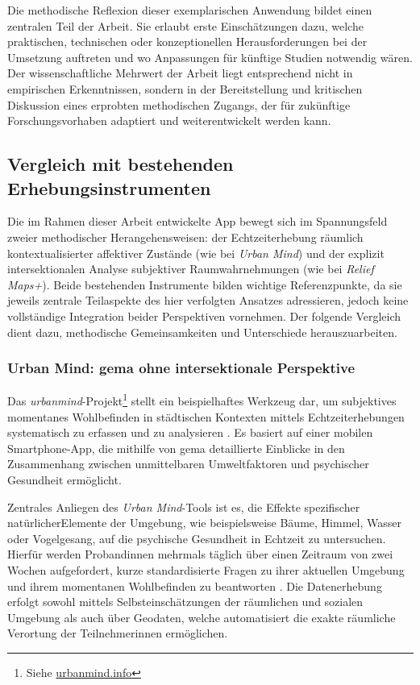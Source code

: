 Die methodische Reflexion dieser exemplarischen Anwendung bildet einen zentralen Teil der Arbeit. Sie erlaubt erste Einschätzungen dazu, welche praktischen, technischen oder konzeptionellen Herausforderungen bei der Umsetzung auftreten und wo Anpassungen für künftige Studien notwendig wären. Der wissenschaftliche Mehrwert der Arbeit liegt entsprechend nicht in empirischen Erkenntnissen, sondern in der Bereitstellung und kritischen Diskussion eines erprobten methodischen Zugangs, der für zukünftige Forschungsvorhaben adaptiert und weiterentwickelt werden kann.


\subsection{Vergleich mit bestehenden Erhebungsinstrumenten}

Die im Rahmen dieser Arbeit entwickelte App bewegt sich im Spannungsfeld zweier methodischer Herangehensweisen: der Echtzeiterhebung räumlich kontextualisierter affektiver Zustände (wie bei \textit{Urban Mind}) und der explizit intersektionalen Analyse subjektiver Raumwahrnehmungen (wie bei \textit{Relief Maps+}). Beide bestehenden Instrumente bilden wichtige Referenzpunkte, da sie jeweils zentrale Teilaspekte des hier verfolgten Ansatzes adressieren, jedoch keine vollständige Integration beider Perspektiven vornehmen. Der folgende Vergleich dient dazu, methodische Gemeinsamkeiten und Unterschiede herauszuarbeiten.

\subsubsection{Urban Mind: \acrshort{gema} ohne intersektionale Perspektive}

Das \textit{\gls{urbanmind}}-Projekt\footnote{Siehe \href{https://www.urbanmind.info/}{urbanmind.info}} stellt ein beispielhaftes Werkzeug dar, um subjektives momentanes Wohlbefinden in städtischen Kontexten mittels Echtzeiterhebungen systematisch zu erfassen und zu analysieren \parencite{bakolisUrbanMindUsing2018}. Es basiert auf einer mobilen Smartphone-App, die mithilfe von \acrshort{gema} detaillierte Einblicke in den Zusammenhang zwischen unmittelbaren Umweltfaktoren und psychischer Gesundheit ermöglicht.

Zentrales Anliegen des \textit{Urban Mind}-Tools ist es, die Effekte spezifischer natürlicherElemente der Umgebung, wie beispielsweise Bäume, Himmel, Wasser oder Vogelgesang, auf die psychische Gesundheit in Echtzeit zu untersuchen. Hierfür werden Proband\genderstern innen mehrmals täglich über einen Zeitraum von zwei Wochen aufgefordert, kurze standardisierte Fragen zu ihrer aktuellen Umgebung und ihrem momentanen Wohlbefinden zu beantworten \parencite{bakolisUrbanMindUsing2018}. Die Datenerhebung erfolgt sowohl mittels Selbsteinschätzungen der räumlichen und sozialen Umgebung als auch über Geodaten, welche automatisiert die exakte räumliche Verortung der Teilnehmer\genderstern innen ermöglichen.

